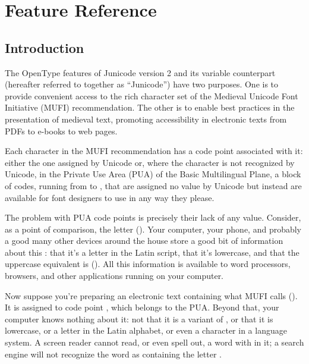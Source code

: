 
\chapter{Feature Reference}\hypertarget{FeatureReference}{}

\section{Introduction}\hypertarget{whynopua}{}
The OpenType features of Junicode version 2 and its variable counterpart (hereafter referred to together as
“Junicode”) have two purposes. One is to provide convenient access to the rich character set of the Medieval Unicode
Font Initiative (MUFI) recommendation. The other is to enable best practices in the presentation of medieval text,
promoting accessibility in electronic texts from PDFs to e-books to web pages.

Each character in the MUFI recommendation has a code point associated with it: either the one
assigned by Unicode or, where the character is not recognized by Unicode, in the Private Use Area (PUA) of the Basic
Multilingual Plane, a block of codes, running from  to , that are assigned no value by Unicode but instead
are available for font designers to use in any way they please.

The problem with PUA code points is precisely their lack of any value. Consider, as a point of comparison, the letter
 (). Your computer, your phone, and probably a good many other devices around the house
store a good bit of information about this : that it’s a letter in the Latin script, that
it’s lowercase, and that the uppercase equivalent is  (). All this information is
available to word processors, browsers, and other applications running on your computer.

Now suppose you're preparing an electronic text containing what MUFI calls  (). It is assigned to code point , which belongs to the PUA. Beyond that, your
computer knows nothing about it: not that it is a variant of , or that it is lowercase, or a letter in the Latin
alphabet, or even a character in a language system. A screen reader cannot read, or even spell out, a word with 
in it; a search engine will not recognize the word as containing the letter .

